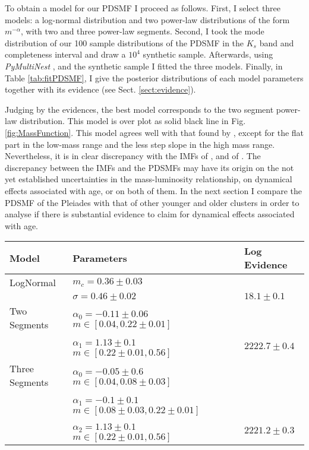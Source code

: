 To obtain a  model for our PDSMF I proceed as follows. First, I select three models: a log-normal distribution and two power-law distributions of the form $m^{-\alpha}$, with two and three power-law segments. Second, I took the mode distribution of our 100 sample distributions of the PDSMF in the $K_s$ band and completeness interval and draw a $10^4$ synthetic sample. Afterwards, using \emph{PyMultiNest} \citep{Buchner2014}, and the synthetic sample I fitted the three models. Finally, in Table \ref{tab:fitPDSMF}, I give the posterior distributions of each model parameters together with its evidence (see Sect. \ref{sect:evidence}).

Judging by the evidences, the best model corresponds to the two segment power-law distribution. This model is over plot as solid black line in Fig. \ref{fig:MassFunction}. This model agrees well with that found by \citet{Bouy2015}, except for the flat part in the low-mass range and the less step slope in the high mass range. Nevertheless, it is in clear discrepancy with the IMFs of \citet{Chabrier2005},  \cite[$m_c=0.25_{-0.016}^{+0.021}$ and $\sigma=0.55_{-0.01}^{+0.05}$, the uncertainties are those reported by][for single objects]{Chabrier2003} and of \citet{Thies2007}. The discrepancy between the IMFs and the PDSMFs \cite[][and ours]{Bouy2015} may have its origin on the not yet established uncertainties in the mass-luminosity relationship, on dynamical effects associated with age, or on both of them. In the next section I compare the PDSMF of the Pleiades with that of other younger and older clusters in order to analyse if there is substantial evidence to claim for dynamical effects associated with age.

\begin{table*}[ht!]
\caption{Parameters and evidence of models fitted to the PDSMF}
\begin{center}
\begin{tabular}{lll}
Model&Parameters& Log Evidence\\
\hline
LogNormal&$m_c=0.36\pm0.03$&\\
                 &$\sigma=0.46\pm0.02$ & $18.1 \pm 0.1$\\
\hline
Two Segments &$\alpha_0=-0.11\pm0.06$ \ \ $m \in [0.04,0.22\pm0.01]$ & \\ 
&  $\alpha_1=1.13\pm0.1$ \ \ $m \in [0.22\pm0.01,0.56]$&$2222.7\pm0.4$\\
\hline
Three Segments &$\alpha_0=-0.05\pm0.6$ \ \ $m \in [0.04,0.08\pm0.03]$ & \\
                          &$\alpha_1=-0.1\pm0.1$ \ \ $m \in [0.08\pm0.03,0.22\pm0.01]$ & \\ 
                          &$\alpha_2=1.13\pm0.1$ \ \ $m \in [0.22\pm0.01,0.56]$&$2221.2\pm 0.3$\\
\hline
\end{tabular}
\end{center}
\label{tab:fitPDSMF}
\end{table*}%

